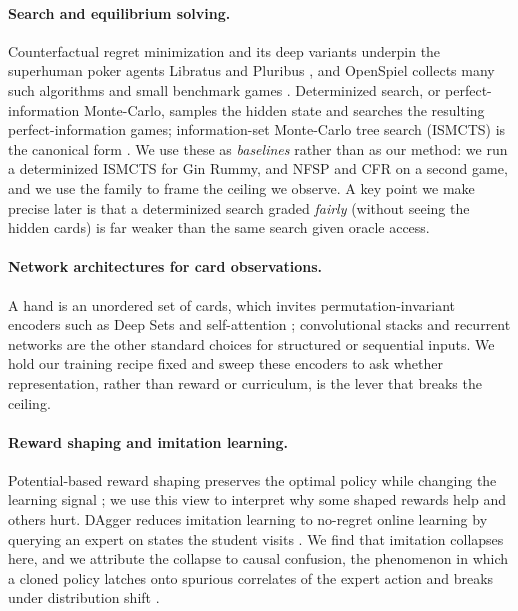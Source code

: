\documentclass[letterpaper]{article} %
\begin{document}
\paragraph{Search and equilibrium solving.}
Counterfactual regret minimization \citep{cfr} and its deep variants
\citep{deepcfr} underpin the superhuman poker agents Libratus and Pluribus
\citep{libratus,pluribus}, and OpenSpiel collects many such algorithms and small
benchmark games \citep{openspiel}. Determinized search, or perfect-information
Monte-Carlo, samples the hidden state and searches the resulting
perfect-information games; information-set Monte-Carlo tree search (ISMCTS) is the
canonical form \citep{ismcts,pimc}. We use these as \emph{baselines} rather than
as our method: we run a determinized ISMCTS for Gin Rummy, and NFSP and CFR on a
second game, and we use the family to frame the ceiling we observe. A key point we
make precise later is that a determinized search graded \emph{fairly} (without
seeing the hidden cards) is far weaker than the same search given oracle access.

\paragraph{Network architectures for card observations.}
A hand is an unordered set of cards, which invites permutation-invariant encoders
such as Deep Sets \citep{deepsets} and self-attention \citep{transformer};
convolutional stacks and recurrent networks \citep{lstm} are the other standard
choices for structured or sequential inputs. We hold our training recipe fixed
and sweep these encoders to ask whether representation, rather than reward or
curriculum, is the lever that breaks the ceiling.

\paragraph{Reward shaping and imitation learning.}
Potential-based reward shaping preserves the optimal policy while changing the
learning signal \citep{shaping}; we use this view to interpret why some shaped
rewards help and others hurt. DAgger reduces imitation learning to no-regret
online learning by querying an expert on states the student visits
\citep{dagger}. We find that imitation collapses here, and we attribute the
collapse to causal confusion, the phenomenon in which a cloned policy latches
onto spurious correlates of the expert action and breaks under distribution
shift \citep{causalconfusion}.
\end{document}
